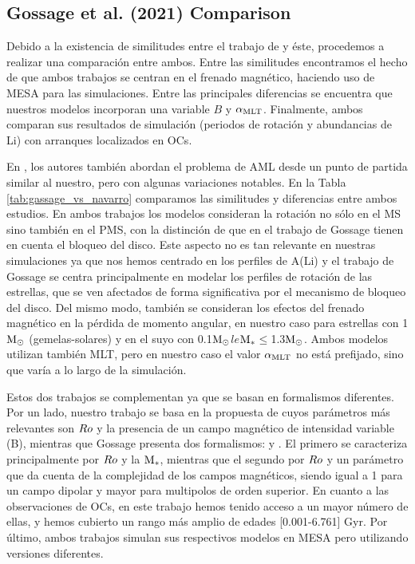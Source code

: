 \subsection{Gossage et al. (2021) Comparison}
Debido a la existencia de similitudes entre el trabajo de \cite{Gossage2021} y éste, procedemos a realizar una comparación entre ambos. Entre las similitudes encontramos el hecho de que ambos trabajos se centran en el frenado magnético, haciendo uso de MESA para las simulaciones. Entre las principales diferencias se encuentra que nuestros modelos incorporan una variable $B$ y $\alpha_{\mathrm{MLT}}$. Finalmente, ambos comparan sus resultados de simulación (periodos de rotación y abundancias de Li) con arranques localizados en OCs.\par

En \cite{Gossage2021}, los autores también abordan el problema de AML desde un punto de partida similar al nuestro, pero con algunas variaciones notables. En la Tabla \ref{tab:gassage_vs_navarro} comparamos las similitudes y diferencias entre ambos estudios. En ambos trabajos los modelos consideran la rotación no sólo en el MS sino también en el PMS, con la distinción de que en el trabajo de Gossage tienen en cuenta el bloqueo del disco. Este aspecto no es tan relevante en nuestras simulaciones ya que nos hemos centrado en los perfiles de A(Li) y el trabajo de Gossage se centra principalmente en modelar los perfiles de rotación de las estrellas, que se ven afectados de forma significativa por el mecanismo de bloqueo del disco. Del mismo modo, también se consideran los efectos del frenado magnético en la pérdida de momento angular, en nuestro caso para estrellas con 1$\mathrm{M}_\odot$ (gemelas-solares) y en el suyo con 0.1$\mathrm{M}_\odot$$le$$\mathrm{M}_*$$\le$1.3$\mathrm{M}_\odot$. Ambos modelos utilizan también MLT, pero en nuestro caso el valor $\alpha_{\mathrm{MLT}}$ no está prefijado, sino que varía a lo largo de la simulación.\par

Estos dos trabajos se complementan ya que se basan en formalismos diferentes. Por un lado, nuestro trabajo se basa en la propuesta de \cite{Gallet2013} cuyos parámetros más relevantes son $Ro$ y la presencia de un campo magnético de intensidad variable (B), mientras que Gossage presenta dos formalismos: \cite{Matt2015} y \cite{Garraffo2018}. El primero se caracteriza principalmente por $Ro$ y la $\mathrm{M}_*$, mientras que el segundo por $Ro$ y un parámetro que da cuenta de la complejidad de los campos magnéticos, siendo igual a 1 para un campo dipolar y mayor para multipolos de orden superior. En cuanto a las observaciones de OCs, en este trabajo hemos tenido acceso a un mayor número de ellas, y hemos cubierto un rango más amplio de edades [0.001-6.761] Gyr. Por último, ambos trabajos simulan sus respectivos modelos en MESA pero utilizando versiones diferentes.\par

